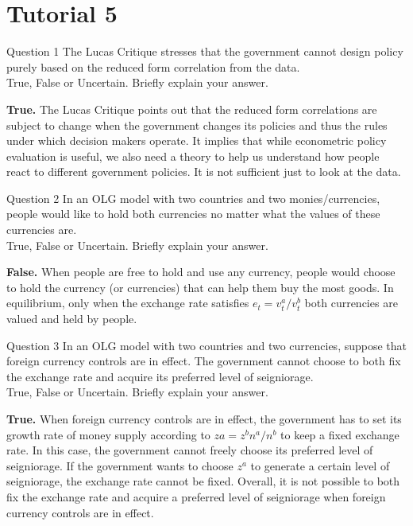 \documentclass[a4paper]{article}
\newif\IfInSansMode
\numberwithin{equation}{section}
\numberwithin{figure}{section}
\begin{document}
\section{Tutorial 5}
	\begin{questionbox}{Question 1}
		The Lucas Critique stresses that the government cannot design policy purely based on the reduced form correlation from the data.\\
		True, False or Uncertain. Briefly explain your answer.
		\begin{explanationbox}
			\textbf{True.} The Lucas Critique points out that the reduced form correlations are subject to change when the government changes its policies and thus the rules under which decision makers operate. It implies that while econometric policy evaluation is useful, we also need a theory to help us understand how people react to different government policies. It is not sufficient just to look at the data.
		\end{explanationbox}
	\end{questionbox}
	\begin{questionbox}{Question 2}
		In an OLG model with two countries and two monies/currencies, people would like to hold both currencies no matter what the values of these currencies are.\\
		True, False or Uncertain. Briefly explain your answer.
		\begin{explanationbox}
			\textbf{False.} When people are free to hold and use any currency, people would choose to hold the currency (or currencies) that can help them buy the most goods. In equilibrium, only when the exchange rate satisfies \( e_t=v_t^a/v_t^b \) both currencies are valued and held by people.
		\end{explanationbox}
	\end{questionbox}
	\begin{questionbox}{Question 3}
		In an OLG model with two countries and two currencies, suppose that foreign currency controls are in effect. The government cannot choose to both fix the exchange rate and acquire its preferred level of seigniorage.\\
		True, False or Uncertain. Briefly explain your answer.
		\begin{explanationbox}
			\textbf{True.} When foreign currency controls are in effect, the government has to set its growth rate of money supply according to \(za = z^bn^a/n^b\) to keep a fixed exchange rate. In this case, the government cannot freely choose its preferred level of seigniorage. If the government wants to choose \(z^a\) to generate a certain level of seigniorage, the exchange rate cannot be fixed. Overall, it is not possible to both fix the exchange rate and acquire a preferred level of seigniorage when foreign currency controls are in effect.
		\end{explanationbox}
	\end{questionbox}
\end{document}
